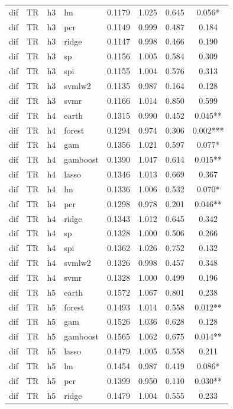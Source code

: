 \begin{ThreePartTable}
\begin{longtable}[t]{llclcccc}
dif & TR & h3 & lm & 0.1179 & 1.025 & 0.645 & 0.056*\\
dif & TR & h3 & pcr & 0.1149 & 0.999 & 0.487 & 0.184\\
dif & TR & h3 & ridge & 0.1147 & 0.998 & 0.466 & 0.190\\
dif & TR & h3 & sp & 0.1156 & 1.005 & 0.584 & 0.309\\
dif & TR & h3 & spi & 0.1155 & 1.004 & 0.576 & 0.313\\
dif & TR & h3 & svmlw2 & 0.1135 & 0.987 & 0.164 & 0.128\\
dif & TR & h3 & svmr & 0.1166 & 1.014 & 0.850 & 0.599\\
\addlinespace
dif & TR & h4 & earth & 0.1315 & 0.990 & 0.452 & 0.045**\\
dif & TR & h4 & forest & 0.1294 & 0.974 & 0.306 & 0.002***\\
dif & TR & h4 & gam & 0.1356 & 1.021 & 0.597 & 0.077*\\
dif & TR & h4 & gamboost & 0.1390 & 1.047 & 0.614 & 0.015**\\
dif & TR & h4 & lasso & 0.1346 & 1.013 & 0.669 & 0.367\\
dif & TR & h4 & lm & 0.1336 & 1.006 & 0.532 & 0.070*\\
dif & TR & h4 & pcr & 0.1298 & 0.978 & 0.201 & 0.046**\\
dif & TR & h4 & ridge & 0.1343 & 1.012 & 0.645 & 0.342\\
dif & TR & h4 & sp & 0.1328 & 1.000 & 0.506 & 0.266\\
dif & TR & h4 & spi & 0.1362 & 1.026 & 0.752 & 0.132\\
dif & TR & h4 & svmlw2 & 0.1326 & 0.998 & 0.457 & 0.348\\
dif & TR & h4 & svmr & 0.1328 & 1.000 & 0.499 & 0.196\\
\addlinespace
dif & TR & h5 & earth & 0.1572 & 1.067 & 0.801 & 0.238\\
dif & TR & h5 & forest & 0.1493 & 1.014 & 0.558 & 0.012**\\
dif & TR & h5 & gam & 0.1526 & 1.036 & 0.628 & 0.128\\
dif & TR & h5 & gamboost & 0.1565 & 1.062 & 0.675 & 0.014**\\
dif & TR & h5 & lasso & 0.1479 & 1.005 & 0.558 & 0.211\\
dif & TR & h5 & lm & 0.1454 & 0.987 & 0.419 & 0.086*\\
dif & TR & h5 & pcr & 0.1399 & 0.950 & 0.110 & 0.030**\\
dif & TR & h5 & ridge & 0.1479 & 1.004 & 0.555 & 0.233\\

\end{longtable}
\end{ThreePartTable}
